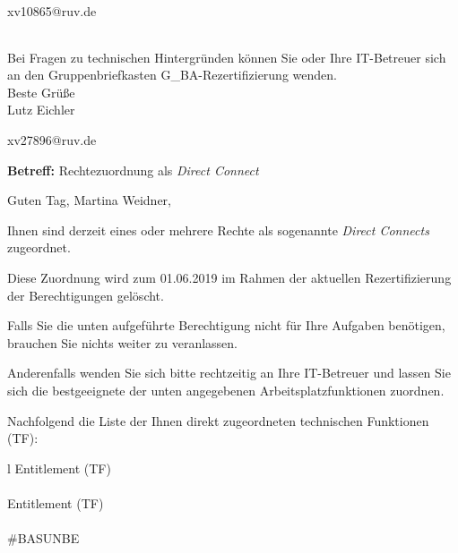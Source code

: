 \documentclass[a4paper,landscape,12pt]{letter}
\begin{document}
\begin{letter}{xv10865@ruv.de\hfill \break}
\begin{tiny}
\begin{longtable}{|p{35mm}|p{15mm}|p{25mm}|p{10mm}|p{40mm}|p{50mm}|p{50mm}|}
\hline
		\end{longtable}
		\end{tiny}
	
\begin{minipage}{\textwidth}
			Bei Fragen zu technischen Hintergründen können Sie 
			oder Ihre IT-Betreuer sich an den Gruppenbriefkasten 
			G\_BA-Rezertifizierung
			wenden.\\
			\linebreak
			Beste Grüße\\
			Lutz Eichler
	\end{minipage}
	\end{letter}
	
\begin{letter}{xv27896@ruv.de\hfill \break}
\begin{normalsize}
	\opening{\textbf{Betreff:} Rechtezuordnung als \emph{Direct Connect}}
	\begin{normalsize} \hfill
	\end{normalsize}

	\begin{normalsize}
		Guten Tag, 
	Martina Weidner, \hfill \break
	\end{normalsize}
	\end{normalsize}
	
\begin{normalsize}
	Ihnen sind derzeit eines oder mehrere Rechte als sogenannte \emph{Direct Connects} zugeordnet.
	
	Diese Zuordnung wird zum 01.06.2019 im Rahmen der aktuellen Rezertifizierung der Berechtigungen gelöscht.
	
	Falls Sie die unten aufgeführte Berechtigung nicht für Ihre Aufgaben benötigen, 
	brauchen Sie nichts weiter zu veranlassen.
	
	Anderenfalls wenden Sie sich bitte rechtzeitig an Ihre IT-Betreuer 
	und lassen Sie sich die bestgeeignete der unten angegebenen Arbeitsplatzfunktionen zuordnen.
	\end{normalsize}
	
\begin{normalsize}
	Nachfolgend die Liste der Ihnen direkt zugeordneten technischen Funktionen (TF):

	\begin{longtable}{l}
		Entitlement (TF) \\ \hline
		\endfirsthead
		\\\hline
		Entitlement (TF) \\ \hline
		\endhead %
		\multicolumn{1}{r@{}}{Fortsetzung \ldots}\\
		\endfoot
		\hline
		\endlastfoot
	\#BASUNBE\\
	\end{longtable}
	\end{normalsize}
	

\end{letter}
\end{document}
